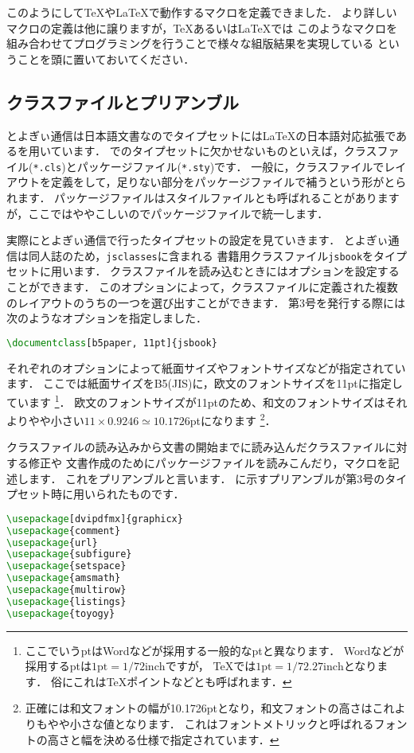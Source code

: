 このようにして{\TeX}や{\LaTeX}で動作するマクロを定義できました．
より詳しいマクロの定義は他に譲りますが，{\TeX}あるいは{\LaTeX}では
このようなマクロを組み合わせてプログラミングを行うことで様々な組版結果を実現している
ということを頭に置いておいてください．

\subsection{クラスファイルとプリアンブル}

とよぎぃ通信は日本語文書なのでタイプセットには{\LaTeX}の日本語対応拡張である{\pLaTeX}を用いています．
{\pLaTeX}でのタイプセットに欠かせないものといえば，クラスファイル(\texttt{*.cls})とパッケージファイル(\texttt{*.sty})です．
一般に，クラスファイルでレイアウトを定義をして，足りない部分をパッケージファイルで補うという形がとられます．
パッケージファイルはスタイルファイルとも呼ばれることがありますが，ここではややこしいのでパッケージファイルで統一します．

実際にとよぎぃ通信で行ったタイプセットの設定を見ていきます．
とよぎぃ通信は同人誌のため，\texttt{jsclasses}に含まれる
書籍用クラスファイル\texttt{jsbook}をタイプセットに用います．
クラスファイルを読み込むときにはオプションを設定することができます．
このオプションによって，クラスファイルに定義された複数のレイアウトのうちの一つを選び出すことができます．
第3号を発行する際には次のようなオプションを指定しました．
\begin{lstlisting}[caption=クラスファイルの指定,label=lis:class,language=tex]
\documentclass[b5paper, 11pt]{jsbook}
\end{lstlisting}
それぞれのオプションによって紙面サイズやフォントサイズなどが指定されています．
ここでは紙面サイズをB5(JIS)に，欧文のフォントサイズを11ptに指定しています
\footnote{ここでいうptはWordなどが採用する一般的なptと異なります．
Wordなどが採用するptは$1\mathrm{pt} = 1 / 72\mathrm{inch}$ですが，
{\TeX}では$1\mathrm{pt} = 1 / 72.27\mathrm{inch}$となります．
俗にこれは{\TeX}ポイントなどとも呼ばれます．}．
欧文のフォントサイズが11ptのため、和文のフォントサイズはそれよりやや小さい$11 \times 0.9246 \simeq 10.1726$ptになります
\footnote{正確には和文フォントの幅が10.1726ptとなり，和文フォントの高さはこれよりもやや小さな値となります．
これはフォントメトリックと呼ばれるフォントの高さと幅を決める仕様で指定されています．}．

クラスファイルの読み込みから文書の開始までに読み込んだクラスファイルに対する修正や
文書作成のためにパッケージファイルを読みこんだり，マクロを記述します．
これをプリアンブルと言います．
に示すプリアンブルが第3号のタイプセット時に用いられたものです．
\begin{lstlisting}[caption=プリアンブル,label=lis:preamble,language=tex]
\usepackage[dvipdfmx]{graphicx}
\usepackage{comment}
\usepackage{url}
\usepackage{subfigure}
\usepackage{setspace}
\usepackage{amsmath}
\usepackage{multirow}
\usepackage{listings}
\usepackage{toyogy}
\end{lstlisting}

